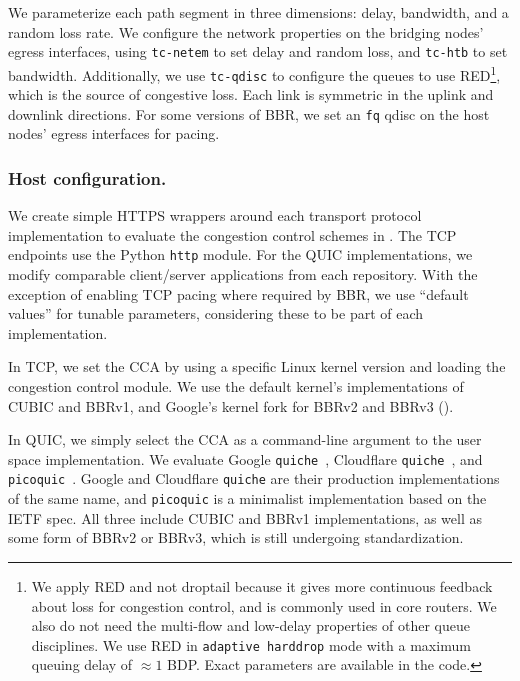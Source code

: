 We parameterize each path segment in three dimensions: delay, bandwidth, and a
random loss rate. We configure the network properties on the bridging nodes'
egress interfaces, using \texttt{tc-netem} to set delay and random loss,
and \texttt{tc-htb} to set bandwidth. Additionally, we use \texttt{tc-qdisc} to
configure the queues to use RED\footnote{We apply RED and not droptail because it gives more
continuous feedback about loss for congestion control, and is commonly used in
core routers. We also do not need the multi-flow and low-delay properties of
other queue disciplines. We use RED in \texttt{adaptive harddrop} mode with a
maximum queuing delay of $\approx1$ BDP. Exact parameters are available in the code.},
which is the source of congestive loss.
Each link is symmetric in
the uplink and downlink directions. For some versions of BBR, we set an \texttt
{fq} qdisc on the host nodes' egress interfaces for pacing.

\subsubsection{Host configuration.}

We create simple HTTPS wrappers around each transport protocol implementation to
evaluate the congestion control schemes in . The TCP
endpoints use the Python \texttt{http} module. For the QUIC implementations, we
modify comparable client/server applications from each repository.
With the exception of enabling TCP pacing where required by BBR, we use
``default values'' for tunable parameters, considering these to be part of each
implementation.

In TCP, we set the CCA by using a specific Linux kernel
version and loading the congestion control module. We use the default
kernel's implementations of CUBIC and BBRv1, and Google's kernel fork for
BBRv2 and BBRv3 ().

In QUIC, we simply select the CCA as a command-line
argument to the user space implementation. We evaluate Google \texttt
{quiche}~\cite{google-quiche}, Cloudflare \texttt{quiche}~\cite
{quiche}, and \texttt{picoquic}~\cite{picoquic}. Google and Cloudflare \texttt
{quiche} are their production implementations of the same name,
and \texttt{picoquic} is a minimalist implementation based on the IETF spec.
All three include CUBIC and BBRv1 implementations, as well as some form of
BBRv2 or BBRv3, which is still undergoing standardization.

